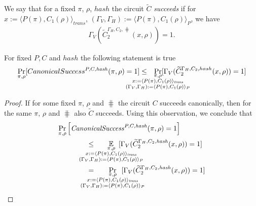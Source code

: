 We say that for a fixed $\pi$, $\rho$, $hash$ the circuit $\widetilde{C}$ \textit{succeeds} if
for $x := \langle P(\pi), C_1(\rho) \rangle_{\mathit{trans}}$,
$(\Gamma_V, \Gamma_H) := \langle P(\pi), C_1(\rho) \rangle_{P}$, we have
\begin{align*}
\Gamma_V(\widetilde{C}_2^{\Gamma_H, C_2, \hash}(x, \rho)) = 1.
\end{align*}
%
\begin{lemma}
  \label{lemma:ctilda_c}
  For fixed $P, C$ and $hash$ the following statement is true
  \begin{align*}
    \underset{\pi, \rho}{\Pr}[CanonicalSuccess^{P, C, \hash}(\pi, \rho) = 1]
    \leq
    \mkern13mu
    \underset{
      \mathclap{
      \substack{
        \pi, \rho \\
        x := \langle P(\pi), C_1(\rho) \rangle_{\mathit{trans}} \\
        (\Gamma_V, \Gamma_H) := \langle P(\pi), C_1(\rho) \rangle_{P}}}}
  {\Pr}[\Gamma_V(\widetilde{C}_2^{\Gamma_H, C_2, hash}(x, \rho)) = 1]
  \end{align*}
\end{lemma}
%
\begin{proof}
If for some fixed $\pi$, $\rho$ and $\hash$ the circuit $C$ succeeds canonically, then for the same $\pi$, $\rho$ and $\hash$ also $\widetilde{C}$ succeeds.
Using this observation, we conclude that
\begin{align*}
  &\underset{\pi, \rho}{\Pr}\left[\CanonicalSuccess^{P, C, \hash}(\pi, \rho) = 1\right] \\
  &\IndII \leq
  \mkern33mu
    \underset{
      \mathclap{
        \substack{\pi, \rho \\
        x := \langle P(\pi), C_1(\rho) \rangle_{\mathit{trans}} \\
        (\Gamma_V, \Gamma_H) := \langle P(\pi), C_1(\rho) \rangle_{P}
      }}}
    {\mathbb{E}}\mkern13mu[\Gamma_V(\widetilde{C}_2^{\Gamma_H, C_2, \hash}(x, \rho)) = 1] \\
  &\IndII =
  \mkern33mu
    \underset{
      \mathclap{
        \substack{\pi, \rho \\
        x := \langle P(\pi), C_1(\rho) \rangle_{\mathit{trans}} \\
        (\Gamma_V, \Gamma_H) := \langle P(\pi), C_1(\rho) \rangle_{P}
      }}}
    {\Pr}\mkern13mu[\Gamma_V(\widetilde{C}_2^{\Gamma_H, C_2, \hash}(x, \rho)) = 1]
\end{align*}
\end{proof}
%
%
